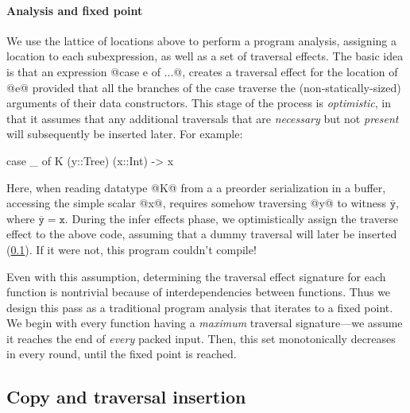 \documentclass[a4paper,english]{lipics-v2016}
\newcommand{\fixed}[1]{\ensuremath{\texttt{#1}}}
\newcommand{\locend}[1]{\ensuremath{\overline{#1}}}
\begin{document}
\paragraph*{Analysis and fixed point}

We use the lattice of locations above to perform a program analysis, assigning a
location to each subexpression, as well as a set of traversal effects.  The
basic idea is that an expression @case e of ...@, creates a traversal effect for
the location of @e@ provided that all the branches of the case traverse the
(non-statically-sized) arguments of their data constructors.
%
{This stage of the process is {\em optimistic}, in that it assumes that any
  additional traversals that are {\em necessary} but not {\em present} will
  subsequently be inserted later.  For example:}
\begin{code}
  case _ of K (y::Tree) (x::Int) -> x
\end{code}
%
Here, when reading datatype @K@ from a a preorder serialization in a buffer,
accessing the simple scalar @x@, requires somehow traversing @y@ to witness
\locend{\fixed{y}}, where $\locend{\fixed{y}} = \fixed{x}$.  During the infer
effects phase, we optimistically assign the traverse effect to the above code,
assuming that a dummy traversal will later be inserted (\cref{sec:copy-insert}).
%
If it were not, this program couldn't compile!


Even with this assumption, determining the traversal effect signature for each
function is nontrivial because of interdependencies between functions.
Thus we design this pass as a {traditional program analysis} that iterates
to a fixed point.
%
We begin with every function having a {\em maximum} traversal signature---we
assume it reaches the end of {\em every} packed input. Then, this set
monotonically decreases in every round, until the fixed point is reached.

\subsection{Copy and traversal insertion}\label{sec:copy-insert}
\end{document}
